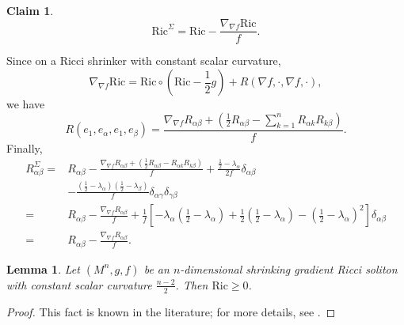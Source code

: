 \documentclass[a4, 12pt]{amsart}
\theoremstyle{plain}
\newtheorem{lem}[theo]{Lemma}
\newtheorem{claim}{Claim}[section]
\begin{document}
\begin{claim}
\begin{equation}\label{ricci-curvature-level-set}
	\mathrm{Ric}^{\Sigma} = \mathrm{Ric} - \frac{\nabla_{\nabla f}\mathrm{Ric}}{f}.
\end{equation}
\end{claim}

Since on a Ricci shrinker with constant scalar curvature,
\begin{equation}\label{Ricci derivative}
	\nabla_{\nabla f}\mathrm{Ric} = \mathrm{Ric} \circ \left(\mathrm{Ric} - \frac{1}{2}g\right) + R(\nabla f, \cdot, \nabla f, \cdot),
\end{equation}
we have
\begin{equation}\label{R1a1b}
	R(e_1, e_\alpha, e_1, e_\beta) = \frac{\nabla_{\nabla f}R_{\alpha\beta} + \left(\frac{1}{2}R_{\alpha\beta} - \sum_{k=1}^n R_{\alpha k}R_{k\beta}\right)}{f}.
\end{equation}
Finally,
\begin{equation*}\label{ricci-level-set-proof}
	\begin{aligned}
		R^{\Sigma}_{\alpha\beta} =& R_{\alpha\beta} - \frac{\nabla_{\nabla f}R_{\alpha\beta} + \left(\frac{1}{2}R_{\alpha\beta} - R_{\alpha k}R_{k\beta}\right)}{f} + \frac{\frac{1}{2} - \lambda_\alpha}{2f}\delta_{\alpha\beta}\\
		& - \frac{\left(\frac{1}{2} - \lambda_\alpha\right)\left(\frac{1}{2} - \lambda_\beta\right)}{f}\delta_{\alpha\gamma}\delta_{\gamma\beta} \\
		=& R_{\alpha\beta} - \frac{\nabla_{\nabla f}R_{\alpha\beta}}{f} + \frac{1}{f}\left[-\lambda_\alpha\left(\frac{1}{2} - \lambda_\alpha\right) + \frac{1}{2}\left(\frac{1}{2} - \lambda_\alpha\right) - \left(\frac{1}{2} - \lambda_\alpha\right)^2\right]\delta_{\alpha\beta} \\
		=& R_{\alpha\beta} - \frac{\nabla_{\nabla f}R_{\alpha\beta}}{f}.
	\end{aligned}
\end{equation*}

\begin{lem}\label{ricci nonnegative}
	Let $(M^n, g, f)$ be an $n$-dimensional shrinking gradient Ricci soliton with constant scalar curvature $\frac{n-2}{2}$. Then $\mathrm{Ric} \geq 0$.
\end{lem}
\begin{proof}
	This fact is known in the literature; for more details, see \cite{FR16}.
\end{proof}
\end{document}
